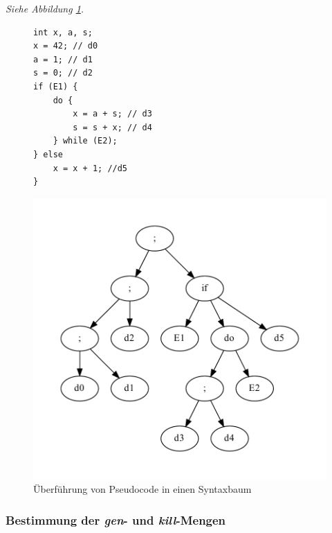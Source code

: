 \textit{Siehe Abbildung \ref{convent:ast}.}
\begin{figure}
    \hfill
    \begin{minipage}{0.4\textwidth}
        \centering
        \begin{lstlisting}
int x, a, s;
x = 42; // d0
a = 1; // d1
s = 0; // d2
if (E1) {
    do {
        x = a + s; // d3
        s = s + x; // d4
    } while (E2);
} else
    x = x + 1; //d5
}
        \end{lstlisting}
    \end{minipage}
    \hfill
    \begin{minipage}{0.5\textwidth}
        \includegraphics[scale=0.5]{images/convent-ast.pdf}
    \end{minipage}
    \hfill
    \caption{Überführung von Pseudocode in einen Syntaxbaum}
    \label{convent:ast}
\end{figure}


\subsubsection{Bestimmung der \textit{gen}- und \textit{kill}-Mengen}

